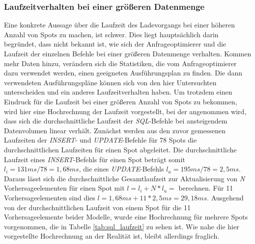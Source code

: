 
\subsubsection{Laufzeitverhalten bei einer größeren Datenmenge}
Eine konkrete Aussage über die Laufzeit des Ladevorgangs bei einer
höheren Anzahl von Spots zu machen, ist schwer. Dies liegt
hauptsächlich darin begründet, dass nicht bekannt ist, wie sich der
Anfrageoptimierer und die Laufzeit der einzelnen Befehle bei einer
größeren Datenmenge verhalten. Kommen mehr Daten hinzu, verändern sich
die Statistiken, die vom Anfrageoptimierer dazu verwendet werden,
einen geeigneten Ausführungsplan zu finden. Die dann verwendeten
Ausführungspläne können sich von den hier Untersuchten unterscheiden
und ein anderes Laufzeitverhalten haben. Um trotzdem einen Eindruck
für die Laufzeit bei einer größeren Anzahl von Spots zu bekommen, wird
hier eine Hochrechnung der Laufzeit vorgestellt, bei der angenommen
wird, dass sich die durchschnittliche Laufzeit der
\textit{SQL}-Befehle bei ansteigendem Datenvolumen linear
verhält. Zunächst werden aus den zuvor gemessenen Laufzeiten der
\textit{INSERT}- und \textit{UPDATE}-Befehle für 78 Spots die
durchschnittlichen Laufzeiten für einen Spot abgeleitet. Die
durchschnittliche Laufzeit eines \textit{INSERT}-Befehls für einen
Spot beträgt somit $l_i = 131 ms / 78 = 1,68 ms$, die eines
\textit{UPDATE}-Befehls $l_u = 195 ms / 78 = 2,5 ms$. Daraus lässt
sich die durchschnittliche Gesamtlaufzeit zur Aktualisierung von
\textit{N} Vorhersageelementen für einen Spot mit $l = l_i + N * l_u =
$ berechnen. Für 11 Vorhersageelementen sind dies $l = 1,68 ms + 11 *
2,5 ms = 29,18 ms$. Ausgehend von der durchschnittlichen Laufzeit von
einem Spot für die 11 Vorhersageelemente beider Modelle, wurde eine
Hochrechnung für mehrere Spots vorgenommen, die in Tabelle
\ref{tab:sql_laufzeit} zu sehen ist. Wie nahe die hier vorgestellte
Hochrechnung an der Realität ist, bleibt allerdings fraglich.


